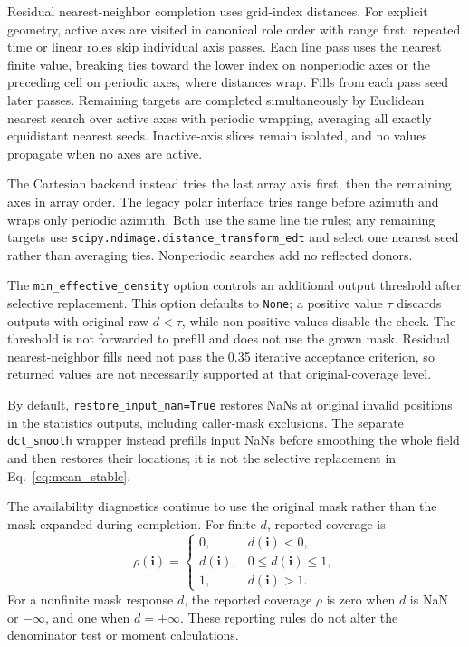 \documentclass[a4paper,fleqn]{cas-sc}
\begin{document}
Residual nearest-neighbor completion uses grid-index distances. For explicit geometry, active axes are visited in canonical role order with range first; repeated time or linear roles skip individual axis passes. Each line pass uses the nearest finite value, breaking ties toward the lower index on nonperiodic axes or the preceding cell on periodic axes, where distances wrap. Fills from each pass seed later passes. Remaining targets are completed simultaneously by Euclidean nearest search over active axes with periodic wrapping, averaging all exactly equidistant nearest seeds. Inactive-axis slices remain isolated, and no values propagate when no axes are active.

The Cartesian backend instead tries the last array axis first, then the remaining axes in array order. The legacy polar interface tries range before azimuth and wraps only periodic azimuth. Both use the same line tie rules; any remaining targets use \texttt{scipy.ndimage.distance\_transform\_edt} and select one nearest seed rather than averaging ties. Nonperiodic searches add no reflected donors.

The \texttt{min\_effective\_density} option controls an additional output threshold after selective replacement. This option defaults to \texttt{None}; a positive value $\tau$ discards outputs with original raw $d<\tau$, while non-positive values disable the check. The threshold is not forwarded to prefill and does not use the grown mask. Residual nearest-neighbor fills need not pass the 0.35 iterative acceptance criterion, so returned values are not necessarily supported at that original-coverage level.

By default, \texttt{restore\_input\_nan=True} restores NaNs at original invalid positions in the statistics outputs, including caller-mask exclusions. The separate \texttt{dct\_smooth} wrapper instead prefills input NaNs before smoothing the whole field and then restores their locations; it is not the selective replacement in Eq.~\ref{eq:mean_stable}.

The availability diagnostics continue to use the original mask rather than the mask expanded during completion. For finite $d$, reported coverage is
\[
\rho(\mathbf{i})=
\begin{cases}
0, & d(\mathbf{i})<0,\\
d(\mathbf{i}), & 0\leq d(\mathbf{i})\leq 1,\\
1, & d(\mathbf{i})>1.
\end{cases}
\]
For a nonfinite mask response $d$, the reported coverage $\rho$ is zero when $d$ is NaN or $-\infty$, and one when $d=+\infty$. These reporting rules do not alter the denominator test or moment calculations.
\end{document}
